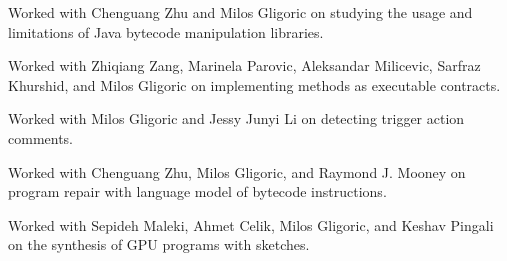 

{\UTAustinAcro}{}{}{
%
  Worked with Chenguang Zhu and Milos Gligoric on studying the usage
  and limitations of Java bytecode manipulation libraries.
%
}

{\UTAustinAcro}{}{}{
%
  Worked with Zhiqiang Zang, Marinela Parovic, Aleksandar Milicevic,
  Sarfraz Khurshid, and Milos Gligoric on implementing methods as
  executable contracts.
%
}

{\UTAustinAcro}{}{}{
%
  Worked with Milos Gligoric and Jessy Junyi Li on detecting trigger
  action comments.
%
}

{\UTAustinAcro}{}{}{
%
  Worked with Chenguang Zhu, Milos Gligoric, and Raymond J. Mooney on
  program repair with language model of bytecode instructions.
%
}

{\UTAustinAcro}{}{}{
%
  Worked with Sepideh Maleki, Ahmet Celik, Milos Gligoric, and Keshav
  Pingali on the synthesis of GPU programs with sketches.
%
}


